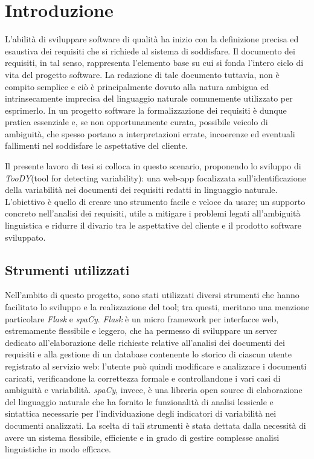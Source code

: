 \documentclass[12pt]{report}
\newcommand{\toody}{\textsl{TooDY}\xspace}
\newcommand{\flask}{\textsl{Flask}\xspace}
\newcommand{\spacy}{\textsl{spaCy}\xspace}
\begin{document}
\chapter{Introduzione}
L’abilità di sviluppare software di qualità ha inizio con la definizione precisa ed esaustiva dei requisiti che si richiede al sistema di soddisfare. Il documento dei requisiti, in tal senso, rappresenta l'elemento base su cui si fonda l’intero ciclo di vita del progetto software. La redazione di tale documento tuttavia, non è compito semplice e ciò è principalmente dovuto alla natura ambigua ed intrinsecamente imprecisa del linguaggio naturale comunemente utilizzato per esprimerlo. In un progetto software la formalizzazione dei requisiti è dunque pratica essenziale e, se non opportunamente curata, possibile veicolo di ambiguità, che spesso portano a interpretazioni errate, incoerenze ed eventuali fallimenti nel soddisfare le aspettative del cliente.

Il presente lavoro di tesi si colloca in questo scenario, proponendo lo sviluppo di \toody (tool for detecting variability): una web-app focalizzata sull’identificazione della variabilità nei documenti dei requisiti redatti in linguaggio naturale. L’obiettivo è quello di creare uno strumento facile e veloce da usare; un supporto concreto nell’analisi dei requisiti, utile a mitigare i problemi legati all’ambiguità linguistica e ridurre il divario tra le aspettative del cliente e il prodotto software sviluppato.


\section{Strumenti utilizzati}
Nell’ambito di questo progetto, sono stati utilizzati diversi strumenti che hanno facilitato lo sviluppo e la realizzazione del tool; tra questi, meritano una menzione particolare \flask e \spacy. \flask è un micro framework per interfacce web, estremamente flessibile e leggero, che ha permesso di sviluppare un server dedicato all’elaborazione delle richieste relative all’analisi dei documenti dei requisiti e alla gestione di un database contenente lo storico di ciascun utente registrato al servizio web: l'utente può quindi modificare e analizzare i documenti caricati, verificandone la correttezza formale e controllandone i vari casi di ambiguità e variabilità. \spacy, invece, è una libreria open source di elaborazione del linguaggio naturale che ha fornito le funzionalità di analisi lessicale e sintattica necessarie per l’individuazione degli indicatori di variabilità nei documenti analizzati. La scelta di tali strumenti è stata dettata dalla necessità di avere un sistema flessibile, efficiente e in grado di gestire complesse analisi linguistiche in modo efficace.
\end{document}
